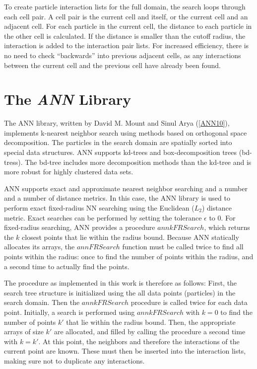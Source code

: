 To create particle interaction lists for the full domain, the search loops through each cell pair. A cell pair is the current cell and itself, or the current cell and an adjacent cell. For each particle in the current cell, the distance to each particle in the other cell is calculated. If the distance is smaller than the cutoff radius, the interaction is added to the interaction pair lists. For increased efficiency, there is no need to check ``backwards'' into previous adjacent cells, as any interactions between the current cell and the previous cell have already been found.

\section{The {\itshape ANN} Library}
\label{SECTION:ANN}


The ANN library, written by David M. Mount and Sinul Arya (\ref{ANN10}), implements k-nearest neighbor search using methods based on orthogonal space decomposition. The particles in the search domain are spatially sorted into special data structures. ANN supports kd-trees and box-decomposition trees (bd-tress). The bd-tree includes more decomposition methods than the kd-tree and is more robust for highly clustered data sets. 

ANN supports exact and approximate nearest neighbor searching and a number and a number of distance metrics. In this case, the ANN library is used to perform exact fixed-radius NN searching using the Euclidean ($L_2$) distance metric. Exact searches can be performed by setting the tolerance $\epsilon$ to 0. For fixed-radius searching, ANN provides a procedure $annkFRSearch$, which returns the $k$ closest points that lie within the radius bound. Because ANN statically allocates its arrays, the $annFRSearch$ function must be called twice to find all points within the radius: once to find the number of points within the radius, and a second time to actually find the points.

The procedure as implemented in this work is therefore as follows:  First, the search tree structure is initialized using the all data points (particles) in the search domain. Then the $annkFRSearch$ procedure is called twice for each data point. Initially, a search is performed using $annkFRSearch$ with $k = 0$ to find the number of points $k'$ that lie within the radius bound.  Then, the appropriate arrays of size $k'$ are allocated, and filled by calling the procedure a second time with $k = k'$. At this point, the neighbors and therefore the interactions of the current point are known. These must then be inserted into the interaction lists, making sure not to duplicate any interactions.

